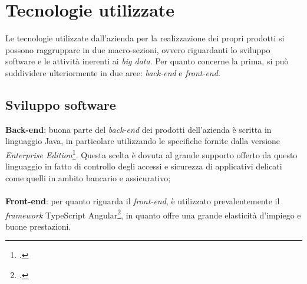 \section{Tecnologie utilizzate}

Le tecnologie utilizzate dall'azienda per la realizzazione dei propri prodotti si possono raggruppare in due macro-sezioni, ovvero riguardanti lo sviluppo software e le attività inerenti ai \textit{big data}.
Per quanto concerne la prima, si può suddividere ulteriormente in due aree: \textit{back-end} e \textit{front-end}.

\subsection{Sviluppo software}
\textbf{Back-end}: buona parte del \textit{back-end} dei prodotti dell'azienda è scritta in linguaggio Java, in particolare utilizzando le specifiche fornite dalla versione \textit{Enterprise Edition}\footcite{https://www.oracle.com/technetwork/java/javaee}. Questa scelta è dovuta al grande supporto offerto da questo linguaggio in fatto di controllo degli accessi e sicurezza di applicativi delicati come quelli in ambito bancario e assicurativo;\\\\
\textbf{Front-end}: per quanto riguarda il \textit{front-end}, è utilizzato prevalentemente il \textit{framework} TypeScript Angular\footcite{https://angular.io/}, in quanto offre una grande elasticità d'impiego e buone prestazioni. \\

